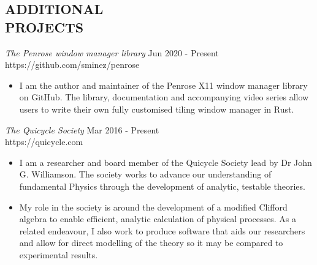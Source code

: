 \documentclass[a4paper, margin, oneside]{res}
\begin{document}
\begin{resume}
\section{ADDITIONAL \\ PROJECTS}             
{\sl The Penrose window manager library} \hfill Jun 2020 - Present \\
https://github.com/sminez/penrose
\begin{itemize}  \itemsep -2pt %
  \item I am the author and maintainer of the Penrose X11 window
        manager library on GitHub. The library, documentation and accompanying
        video series allow users to write their own fully customised tiling
        window manager in Rust.
\end{itemize}

{\sl The Quicycle Society} \hfill Mar 2016 - Present \\
https://quicycle.com
\begin{itemize}  \itemsep -2pt %
  \item I am a researcher and board member of the Quicycle Society lead by
        Dr John G. Williamson. The society works to advance our understanding
        of fundamental Physics through the development of analytic, testable
        theories.
  \item My role in the society is around the development of a modified Clifford
        algebra to enable efficient, analytic calculation of physical processes.
        As a related endeavour, I also work to produce software that aids our
        researchers and allow for direct modelling of the theory so it may be
        compared to experimental results.
\end{itemize}

\end{resume}
\end{document}
